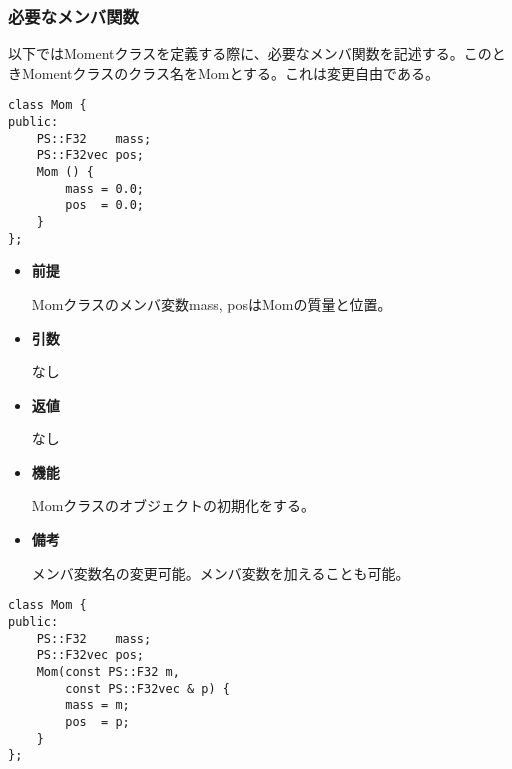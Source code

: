 \subsubsection{必要なメンバ関数}


以下ではMomentクラスを定義する際に、必要なメンバ関数を記述する。このと
きMomentクラスのクラス名をMomとする。これは変更自由である。


\begin{screen}
\begin{verbatim}
class Mom {
public:
    PS::F32    mass;
    PS::F32vec pos;
    Mom () {
        mass = 0.0;
        pos  = 0.0;
    }
};
\end{verbatim}
\end{screen}

\begin{itemize}

\item {\bf 前提}

  Momクラスのメンバ変数mass, posはMomの質量と位置。
  
\item {\bf 引数}

  なし
  
\item {\bf 返値}

  なし

\item {\bf 機能}

  Momクラスのオブジェクトの初期化をする。
  
\item {\bf 備考}

  メンバ変数名の変更可能。メンバ変数を加えることも可能。

\end{itemize}

\begin{screen}
\begin{verbatim}
class Mom {
public:
    PS::F32    mass;
    PS::F32vec pos;
    Mom(const PS::F32 m,
        const PS::F32vec & p) {
        mass = m;
        pos  = p;
    }
};
\end{verbatim}
\end{screen}

